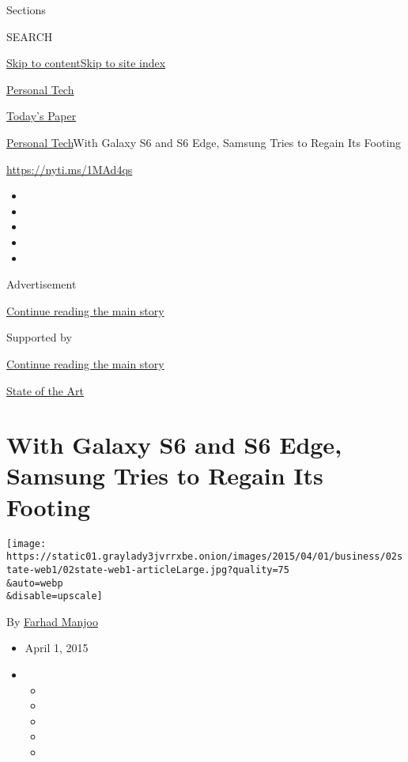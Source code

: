 Sections

SEARCH

\protect\hyperlink{site-content}{Skip to
content}\protect\hyperlink{site-index}{Skip to site index}

\href{https://www.nytimes3xbfgragh.onion/section/technology/personaltech}{Personal
Tech}

\href{https://myaccount.nytimes3xbfgragh.onion/auth/login?response_type=cookie\&client_id=vi}{}

\href{https://www.nytimes3xbfgragh.onion/section/todayspaper}{Today's
Paper}

\href{/section/technology/personaltech}{Personal Tech}\textbar{}With
Galaxy S6 and S6 Edge, Samsung Tries to Regain Its Footing

\url{https://nyti.ms/1MAd4qs}

\begin{itemize}
\item
\item
\item
\item
\item
\end{itemize}

Advertisement

\protect\hyperlink{after-top}{Continue reading the main story}

Supported by

\protect\hyperlink{after-sponsor}{Continue reading the main story}

\href{/column/state-of-the-art}{State of the Art}

\hypertarget{with-galaxy-s6-and-s6-edge-samsung-tries-to-regain-its-footing}{%
\section{With Galaxy S6 and S6 Edge, Samsung Tries to Regain Its
Footing}\label{with-galaxy-s6-and-s6-edge-samsung-tries-to-regain-its-footing}}

\texttt{[image: https://static01.graylady3jvrrxbe.onion/images/2015/04/01/business/02state-web1/02state-web1-articleLarge.jpg?quality=75\\\&auto=webp\\\&disable=upscale]}

By \href{http://www.nytimes3xbfgragh.onion/by/farhad-manjoo}{Farhad
Manjoo}

\begin{itemize}
\item
  April 1, 2015
\item
  \begin{itemize}
  \item
  \item
  \item
  \item
  \item
  \end{itemize}
\end{itemize}


